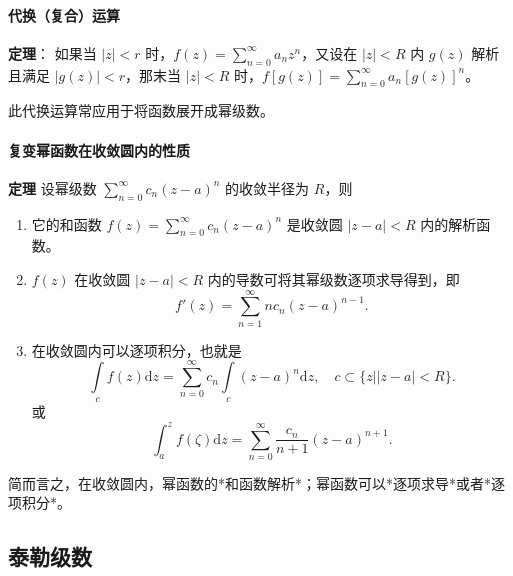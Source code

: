\paragraph{代换（复合）运算}
\label{代换复合运算}
\textbf{定理}： 如果当 \(|z|<r\)
时，\(f(z)=\sum\limits _{n=0}^{\infty} a_{n}z^{n}\)，又设在 \(|z|<R\) 内
\(g(z)\) 解析且满足 \(|g(z)|<r\)，那末当 \(|z|<R\)
时，\(f[g(z)]=\sum\limits_{n=0}^{\infty} a_{n}[g(z)]^{n}\)。

\begin{tcolorbox}[title={说明},colback=red!5!white
,colframe=red!75!black
,colbacktitle=yellow!50!red
,coltitle=red!25!black, fonttitle=\bfseries,subtitle style={boxrule=0.4pt, colback=yellow!50!red!25!white}]
此代换运算常应用于将函数展开成幂级数。

\end{tcolorbox}
\paragraph{复变幂函数在收敛圆内的性质}
\label{复变幂函数在收敛圆内的性质}
\textbf{定理} 设幂级数 \(\sum\limits_{n=0}^{\infty} c_{n}(z-a)^{n}\)
的收敛半径为 \(R\)，则

\begin{enumerate}
\item 它的和函数 \(f(z) = \sum\limits_{n=0}^{\infty} c_{n}(z-a)^{n}\)
是收敛圆 \(|z-a| < R\) 内的解析函数。
\item \(f(z)\) 在收敛圆 \(|z-a| < R\) 内的导数可将其幂级数逐项求导得到，即
\[
   f'(z) = \sum_{n=1}^{\infty} n c_{n}(z-a)^{n-1}.
   \]
\item 在收敛圆内可以逐项积分，也就是
\[
   \int\limits _c f(z)\mathrm{d}z = \sum _{n=0}^{\infty} c_n\int\limits _c (z-a)^n \mathrm{d}z, \quad c \subset \{ z | \left| z-a \right| < R \}.
   \]
或
\[
   \int _a^z f(\zeta)\mathrm{d}z = \sum _{n=0}^{\infty}\frac{c_n}{n+1}(z-a)^{n+1}.
   \]
\end{enumerate}

\begin{tcolorbox}[title={Note},colback=red!5!white
,colframe=red!75!black
,colbacktitle=yellow!50!red
,coltitle=red!25!black, fonttitle=\bfseries,subtitle style={boxrule=0.4pt, colback=yellow!50!red!25!white}]
简而言之，在收敛圆内，幂函数的*和函数解析*；幂函数可以*逐项求导*或者*逐项积分*。

\end{tcolorbox}
\subsection{泰勒级数}
\label{泰勒级数}
